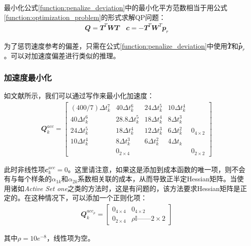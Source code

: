 最小化公式\eqref{function:penalize_deviation}中的最小化平方范数相当于用公式\eqref{function:optimization_problem}的形式求解QP问题：
\begin{align}
    \mathbfit{Q}=\mathbfit{T}^T\mathbfit{W}\mathbfit{T} \quad \mathbfit{c}=-\mathbfit{T}^T\mathbfit{W}^T\mathbfit{p}_r
\end{align}

为了惩罚速度参考的偏差，只需在公式\eqref{function:penalize_deviation}中使用̇$\mathbfit{\dot T}$和̇$\mathbfit{\dot p}_r$。可以对加速度偏差进行类似的推理。

\subsubsection{加速度最小化}
如文献\cite[p]{Kalakrishnan_Buchli_Pastor_Mistry_Schaal_2010}所示，我们可以通过写作来最小化加速度：
\begin{align}
    \label{function:cost_Q_k1}
    {\mathbfit Q}_k^{acc} = 
    \begin{bmatrix}
    (400/7)\Delta t_k^7 & 40\Delta t_k^6 & 24\Delta t_k^5 & 10\Delta t_k^4 & \\
    40\Delta t_k^6 & 28.8\Delta t_k^5 & 18\Delta t_k^4 & 8\Delta t_k^3 & \\
    24\Delta t_k^5 & 18\Delta t_k^4 & 12\Delta t_k^3 & 6\Delta t_k^2 & {\mathbfit 0}_{4\times 2}\\
    10\Delta t_k^4 & 8\Delta t_k^3 & 6\Delta t_k^2 & 4\Delta t_k &\\
     & {\mathbfit 0}_{2\times 4} & & & {\mathbfit 0}_{2\times 2}
    \end{bmatrix}
\end{align}

此时非线性项$\mathbfit{c}_k^{acc}=0$。这里请注意，如果这是添加到成本函数的唯一项，则不会有与每个样条的$\alpha_{1k}$和$\alpha_{2k}$系数相关联的成本，从而导致正半定Hessian矩阵。当使用诸如\emph{Active Set one}\cite[p]{Goldfarb_Idnani_1983}之类的方法时，这是有问题的，该方法要求Hessian矩阵是正定的。在这种情况下，可以添加一个正则化项：
\begin{align}
    \label{function:cost_Q_k2}
    \mathbfit{Q}_k^{acc_{\rho}}=\begin{bmatrix}
        0_{4\times4} & 0_{4\times2}\\
        0_{2\times4} & \rho \mathbb{I}——{2\times2}
    \end{bmatrix}
\end{align}

其中$\rho=10e^{{-8}}$，线性项为空。

